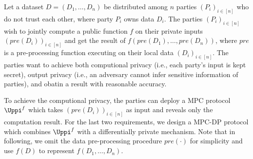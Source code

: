 Let a dataset $D=\left( D_{1},\ldots, D_{n}\right) $ be distributed among $n$ parties $\left( P_{i}\right) _{i\in \left[ n\right] }$ who do not trust each other, where party $P_{i}$ owns data $D_{i}$. The parties $\left(P_{i}\right)_{i \in \left[ n\right]} $ wish to jointly compute a public function $f$ on their private inputs $\left(pre\left(D_i\right)\right)_{i \in \left[ n\right]} $ and get the result of $f\left(pre\left(D_1\right),\ldots,pre\left(D_n\right)\right)$, where $pre$ is a pre-processing function executing on their local data $\left(D_i\right)_{i \in \left[ n\right]} $. The parties want to achieve both computional privacy (i.e., each party's input is kept secret), output privacy (i.e., an adversary cannot infer sensitive information of parties), and obatin a result with reasonable accuracy.

To achieve the computional privacy, the parties can deploy a MPC protocol $\Uppi^{f}$ which takes $\left(pre\left(D_i\right)\right)_{i \in \left[ n\right]} $ as input and reveals only the computation result. For the last two requirements, we design a MPC-DP protocol which combines $\Uppi^{f}$ with a differentially private mechanism. Note that in following, we omit the data pre-processing procedure $pre\left(\cdot\right) $ for simplicity and use $f\left( D\right)$ to represent $f\left(D_1,\ldots,D_n\right)$.

